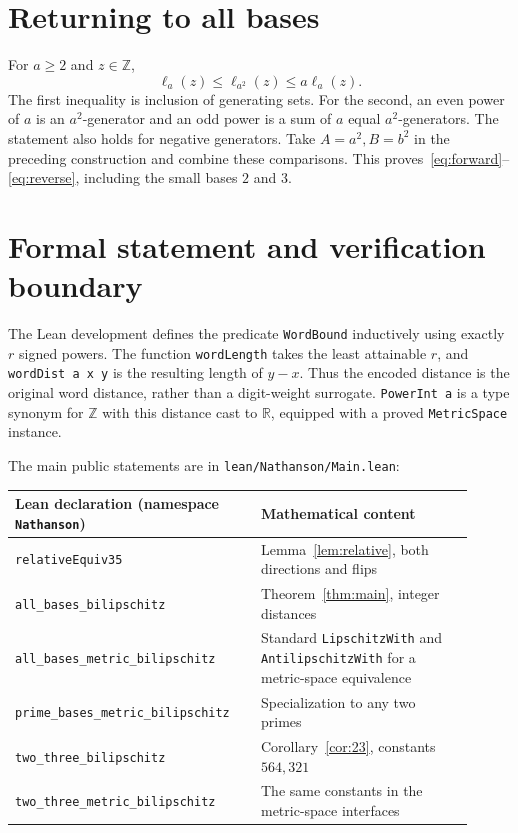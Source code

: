 \documentclass[11pt]{article}
\newcommand{\Z}{\mathbb Z}
\begin{document}
\section{Returning to all bases}
For $a\ge2$ and $z\in\Z$,
\[
 \ell_a(z)\le\ell_{a^2}(z)\le a\ell_a(z).
\]
The first inequality is inclusion of generating sets. For the second,
an even power of $a$ is an $a^2$-generator and an odd power is a sum of
$a$ equal $a^2$-generators. The statement also holds for negative
generators. Take $A=a^2,B=b^2$ in the preceding construction and combine
these comparisons. This proves~\eqref{eq:forward}--\eqref{eq:reverse},
including the small bases $2$ and $3$.

\section{Formal statement and verification boundary}
The Lean development defines the predicate \texttt{WordBound} inductively
using exactly $r$ signed powers. The function \texttt{wordLength} takes the least attainable
$r$, and \texttt{wordDist a x y} is the resulting length of $y-x$.
Thus the encoded distance is the original word distance, rather than a
digit-weight surrogate. \texttt{PowerInt a} is a type synonym for $\Z$
with this distance cast to $\mathbb R$, equipped with a proved
\texttt{MetricSpace} instance.

The main public statements are in \texttt{lean/Nathanson/Main.lean}:
\begin{center}\small
\begin{tabular}{>{\raggedright\arraybackslash}p{0.48\linewidth}>{\raggedright\arraybackslash}p{0.43\linewidth}}
\toprule
Lean declaration (namespace \texttt{Nathanson}) & Mathematical content\\
\midrule
\texttt{relativeEquiv35} & Lemma~\ref{lem:relative}, both directions and flips\\
\texttt{all\_bases\_bilipschitz} & Theorem~\ref{thm:main}, integer distances\\
\texttt{all\_bases\_metric\_bilipschitz} & Standard \texttt{LipschitzWith} and \texttt{AntilipschitzWith} for a metric-space equivalence\\
\texttt{prime\_bases\_metric\_bilipschitz} & Specialization to any two primes\\
\texttt{two\_three\_bilipschitz} & Corollary~\ref{cor:23}, constants $564,321$\\
\texttt{two\_three\_metric\_bilipschitz} & The same constants in the metric-space interfaces\\
\bottomrule
\end{tabular}
\end{center}
\end{document}
